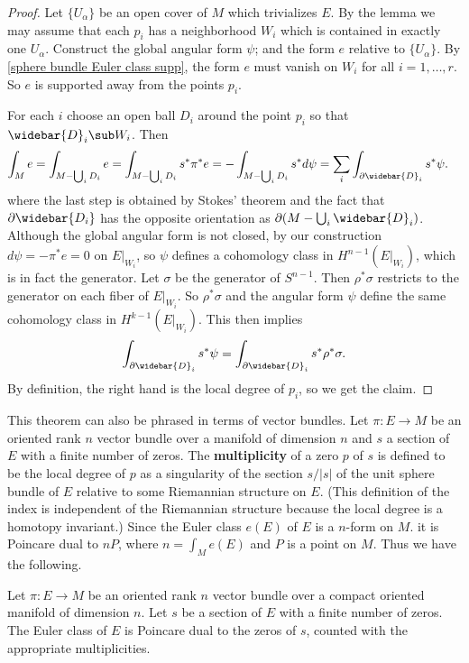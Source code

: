 \begin{proof}
Let $\{U_\alpha\}$ be an open cover of $M$ which trivializes $E$. By the lemma we may assume that each $p_i$ has a neighborhood $W_i$ which is contained in exactly one 
$U_\alpha$. Construct the global angular form $\psi$; and the form $e$ relative to $\{U_\alpha\}$. By \cref{sphere bundle Euler class supp}, the form 
$e$ must vanish on $W_i$ for all $i=1,\dots,r$. So $e$ is supported away from the points $p_i$.\par
For each $i$ choose an open ball $D_i$ around the point $p_i$ so that $\widebar{D}_i\sub W_i$. Then
\begin{align*}
\int_Me&=\int_{M-\bigcup_iD_i}e=\int_{M-\bigcup_iD_i}s^*\pi^*e=-\int_{M-\bigcup_iD_i}s^*d\psi=\sum_i\int_{\partial\widebar{D}_i}s^*\psi.
\end{align*}
where the last step is obtained by Stokes' theorem and the fact that $\partial\widebar{D_i}$ has the opposite orientation as $\partial(M-\bigcup_i\widebar{D}_i)$. 
Although the global angular form is not closed, by our construction $d\psi=-\pi^*e=0$ on $E|_{W_i}$, so $\psi$ defines a cohomology class in $H^{n-1}(E|_{W_i})$, which 
is in fact the generator. Let $\sigma$ be the generator of $S^{n-1}$. Then $\rho^*\sigma$ restricts to the generator on each fiber of $E|_{W_i}$. So $\rho^*\sigma$ and 
the angular form $\psi$ define the same cohomology class in $H^{k-1}(E|_{W_i})$. This then implies
\[\int_{\partial\widebar{D}_i}s^*\psi=\int_{\partial\widebar{D}_i}s^*\rho^*\sigma.\]
By definition, the right hand is the local degree of $p_i$, so we get the claim.
\end{proof}
This theorem can also be phrased in terms of vector bundles. Let $\pi:E\to M$ be an oriented rank $n$ vector bundle over a manifold of dimension $n$ and $s$ a section 
of $E$ with a finite number of zeros. The \textbf{multiplicity} of a zero $p$ of $s$ is defined to be the local degree of $p$ as a singularity of the section $s/|s|$ of 
the unit sphere bundle of $E$ relative to some Riemannian structure on $E$. (This definition of the index is independent of the Riemannian structure because the local 
degree is a homotopy invariant.) Since the Euler class $e(E)$ of $E$ is a $n$-form on $M$. it is Poincare dual to $nP$, where $n=\int_Me(E)$ and $P$ is a point on $M$. 
Thus we have the following.
\begin{theorem}
Let $\pi:E\to M$ be an oriented rank $n$ vector bundle over a compact oriented manifold of dimension $n$. Let $s$ be a section of $E$ with a finite number of zeros. The 
Euler class of $E$ is Poincare dual to the zeros of $s$, counted with the appropriate multiplicities.
\end{theorem}
